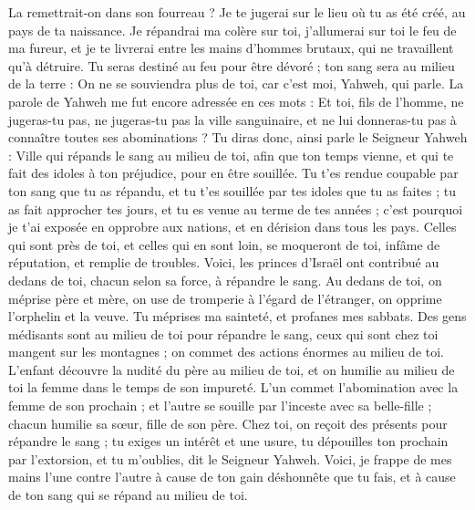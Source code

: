 \begin{multicols}{2}
La remettrait-on dans son fourreau ? Je te jugerai sur le lieu où tu as été créé, au pays de ta naissance.
Je répandrai ma colère sur toi, j'allumerai sur toi le feu de ma fureur, et je te livrerai entre les mains d'hommes brutaux, qui ne travaillent qu'à détruire.
Tu seras destiné au feu pour être dévoré ; ton sang sera au milieu de la terre : On ne se souviendra plus de toi, car c'est moi, Yahweh, qui parle.
\VerseOne{}La parole de Yahweh me fut encore adressée en ces mots :
Et toi, fils de l'homme, ne jugeras-tu pas, ne jugeras-tu pas la ville sanguinaire, et ne lui donneras-tu pas à connaître toutes ses abominations ?
Tu diras donc, ainsi parle le Seigneur Yahweh : Ville qui répands le sang au milieu de toi, afin que ton temps vienne, et qui te fait des idoles à ton préjudice, pour en être souillée.
Tu t'es rendue coupable par ton sang que tu as répandu, et tu t'es souillée par tes idoles que tu as faites ; tu as fait approcher tes jours, et tu es venue au terme de tes années ; c'est pourquoi je t'ai exposée en opprobre aux nations, et en dérision dans tous les pays.
Celles qui sont près de toi, et celles qui en sont loin, se moqueront de toi, infâme de réputation, et remplie de troubles.
Voici, les princes d'Israël ont contribué au dedans de toi, chacun selon sa force, à répandre le sang.
Au dedans de toi, on méprise père et mère, on use de tromperie à l'égard de l'étranger, on opprime l'orphelin et la veuve.
Tu méprises ma sainteté, et profanes mes sabbats.
Des gens médisants sont au milieu de toi pour répandre le sang, ceux qui sont chez toi mangent sur les montagnes ; on commet des actions énormes au milieu de toi.
L'enfant découvre la nudité du père au milieu de toi, et on humilie au milieu de toi la femme dans le temps de son impureté.
L'un commet l'abomination avec la femme de son prochain ; et l'autre se souille par l'inceste avec sa belle-fille ; chacun humilie sa sœur, fille de son père.
Chez toi, on reçoit des présents pour répandre le sang ; tu exiges un intérêt et une usure, tu dépouilles ton prochain par l'extorsion, et tu m'oublies, dit le Seigneur Yahweh.
Voici, je frappe de mes mains l'une contre l'autre à cause de ton gain déshonnête que tu fais, et à cause de ton sang qui se répand au milieu de toi.

\end{multicols}
